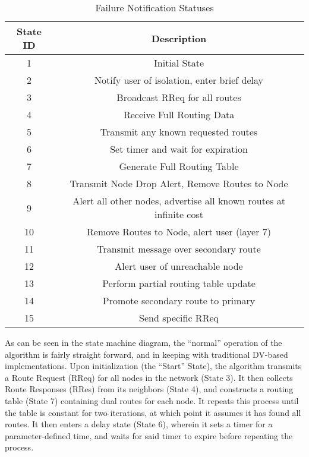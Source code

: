 \begin{table}[ht]
    \centering\begin{tabular}{|c|c|}
        \hline
        State ID & Description \\
        \hline
        \hline
        1 & Initial State \\
        \hline
        2 & Notify user of isolation, enter brief delay \\
        \hline
        3 & Broadcast RReq for all routes \\
        \hline
        4 & Receive Full Routing Data \\
        \hline
        5 & Transmit any known requested routes \\
        \hline
        6 & Set timer and wait for expiration \\
        \hline
        7 & Generate Full Routing Table \\
        \hline
        8 & Transmit Node Drop Alert, Remove Routes to Node\\
        \hline
        9 & Alert all other nodes, advertise all known routes at infinite cost \\
        \hline
        10 & Remove Routes to Node, alert user (layer 7) \\
        \hline
        11 & Transmit message over secondary route \\
        \hline
        12 & Alert user of unreachable node \\
        \hline
        13 & Perform partial routing table update \\
        \hline
        14 & Promote secondary route to primary \\
        \hline
        15 & Send specific RReq \\
        \hline

    \end{tabular}
    \caption{Failure Notification Statuses}
    \label{table:FSMDescriptions}
\end{table}

As can be seen in the state machine diagram, the ``normal'' operation of the algorithm is fairly straight forward, and in keeping with traditional DV-based implementations. Upon initialization (the ``Start'' State), the algorithm transmits a Route Request (RReq) for all nodes in the network (State 3). It then collects Route Responses (RRes) from its neighbors (State 4), and constructs a routing table (State 7) containing dual routes for each node. It repeats this process until the table is constant for two iterations, at which point it assumes it has found all routes. It then enters a delay state (State 6), wherein it sets a timer for a parameter-defined time, and waits for said timer to expire before repeating the process.

